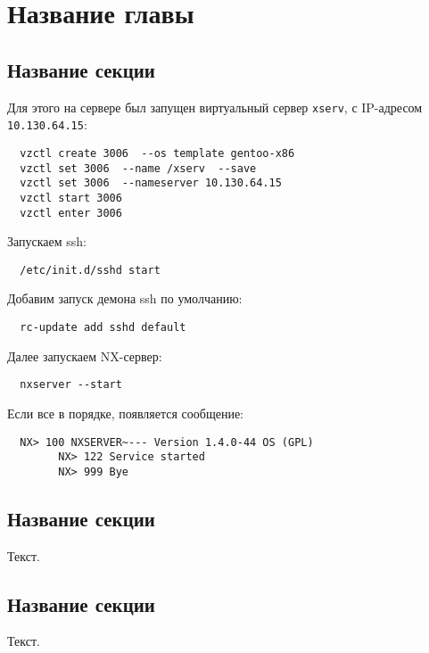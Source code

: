 
\chapter{Название главы}
\label{chap3}

\section{Название секции}
\label{chap3:sec1}

% 
Для этого на сервере был запущен виртуальный сервер 
\verb|xserv|, с IP-адресом \verb|10.130.64.15|:

\begin{verbatim}
  vzctl create 3006  --os template gentoo-x86
  vzctl set 3006  --name /xserv  --save
  vzctl set 3006  --nameserver 10.130.64.15
  vzctl start 3006
  vzctl enter 3006
\end{verbatim}
Запускаем ssh:
\begin{verbatim}
  /etc/init.d/sshd start 
\end{verbatim}
Добавим запуск демона ssh по умолчанию:
\begin{verbatim}
  rc-update add sshd default
\end{verbatim}

Далее запускаем NX-сервер:
\begin{verbatim}
  nxserver --start
\end{verbatim}
Если все в порядке, появляется сообщение:
\begin{verbatim}
  NX> 100 NXSERVER~--- Version 1.4.0-44 OS (GPL)
        NX> 122 Service started
        NX> 999 Bye
\end{verbatim}


\section{Название секции}
\label{chap3:sec2}

Текст.

\section{Название секции}
\label{chap3:sec3}

Текст.

